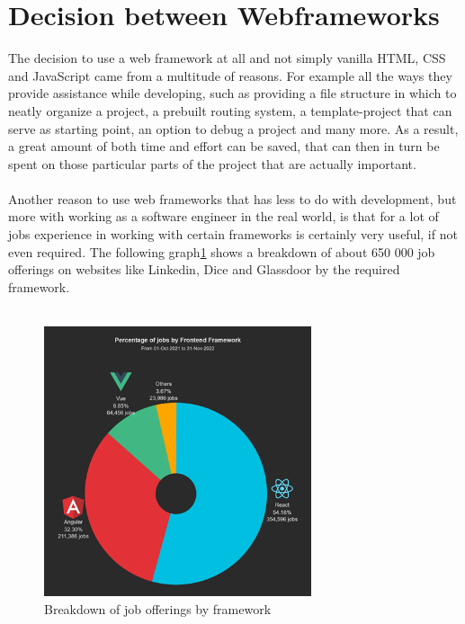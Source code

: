 \section{Decision between Webframeworks}
The decision to use a web framework at all and not simply vanilla HTML, CSS and JavaScript came from a multitude of reasons.
For example all the ways they provide assistance while developing, such as providing a file structure in which to neatly 
organize a project, a prebuilt routing system, a template-project that can serve as starting point, an option to debug a 
project and many more. As a result, a great amount of both time and effort can be saved, that can then in turn be spent on 
those particular parts of the project that are actually important.
\\
\\
Another reason to use web frameworks that has less to do with development, but more with working as a software engineer in 
the real world, is that for a lot of jobs experience in working with certain frameworks is certainly very useful, if not 
even required. The following graph\ref{fig:WebframeworkJobs} shows a breakdown of about 650 000 job offerings on websites like Linkedin, 
Dice and Glassdoor by the required framework. \cite{WebframeworkJobs}
\\
\\
\begin{figure}[htb]
  \centering
  \includegraphics[width=0.7\textwidth]{pics/piechartwebframework.png}
  \caption{Breakdown of job offerings by framework}
  \label{fig:WebframeworkJobs}
\end{figure}
\\
\\
